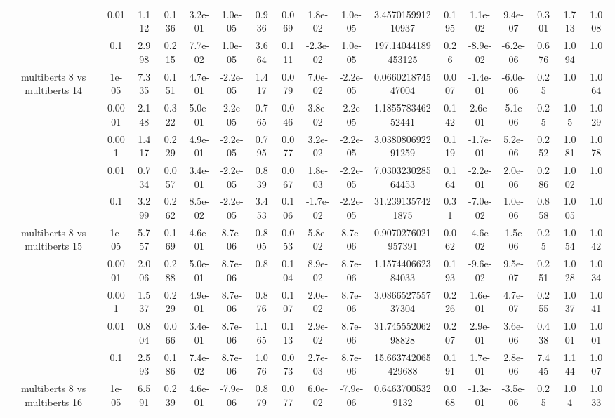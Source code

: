 \begin{tabular}{|c|c|c|c|c|c|c|c|c|c|c|c|c|c|c|c|c|}
 & 0.01 & 1.112 & 0.136 & 3.2e-01 & 1.0e-05 & 0.936 & 0.069 & 1.8e-02 & 1.0e-05 & 3.457015991210937 & 0.195 & 1.1e-02 & 9.4e-07 & 0.301 & 1.713 & 1.008 \\
 & 0.1 & 2.998 & 0.215 & 7.7e-02 & 1.0e-05 & 3.664 & 0.111 & -2.3e-02 & 1.0e-05 & 197.14044189453125 & 0.26 & -8.9e-02 & -6.2e-06 & 0.676 & 1.094 & 1.0 \\
\hline
\multirow{5}{*}{multiberts 8 vs multiberts 14} & 1e-05 & 7.335 & 0.151 & 4.7e-01 & -2.2e-05 & 1.417 & 0.079 & 7.0e-02 & -2.2e-05 & 0.066021874547004 & 0.007 & -1.4e-01 & -6.0e-06 & 0.25 & 1.0 & 1.064 \\
 & 0.0001 & 2.148 & 0.322 & 5.0e-01 & -2.2e-05 & 0.765 & 0.046 & 3.8e-02 & -2.2e-05 & 1.185578346252441 & 0.142 & 2.6e-01 & -5.1e-06 & 0.25 & 1.05 & 1.029 \\
 & 0.001 & 1.417 & 0.229 & 4.9e-01 & -2.2e-05 & 0.795 & 0.077 & 3.2e-02 & -2.2e-05 & 3.038080692291259 & 0.119 & -1.7e-01 & 5.2e-06 & 0.252 & 1.081 & 1.078 \\
 & 0.01 & 0.734 & 0.057 & 3.4e-01 & -2.2e-05 & 0.839 & 0.067 & 1.8e-03 & -2.2e-05 & 7.030323028564453 & 0.164 & -2.2e-01 & 2.0e-06 & 0.286 & 1.002 & 1.0 \\
 & 0.1 & 3.299 & 0.262 & 8.5e-02 & -2.2e-05 & 3.453 & 0.106 & -1.7e-02 & -2.2e-05 & 31.2391357421875 & 0.31 & -7.0e-02 & 1.0e-06 & 0.858 & 1.005 & 1.0 \\
\hline
\multirow{5}{*}{multiberts 8 vs multiberts 15} & 1e-05 & 5.757 & 0.169 & 4.6e-01 & 8.7e-06 & 0.805 & 0.053 & 5.8e-02 & 8.7e-06 & 0.9070276021957391 & 0.062 & -4.6e-02 & -1.5e-06 & 0.25 & 1.054 & 1.042 \\
 & 0.0001 & 2.006 & 0.288 & 5.0e-01 & 8.7e-06 & 0.8 & 0.104 & 8.9e-02 & 8.7e-06 & 1.157440662384033 & 0.193 & -9.6e-02 & 9.5e-07 & 0.251 & 1.028 & 1.034 \\
 & 0.001 & 1.537 & 0.229 & 4.9e-01 & 8.7e-06 & 0.876 & 0.107 & 2.0e-02 & 8.7e-06 & 3.086652755737304 & 0.226 & 1.6e-01 & 4.7e-07 & 0.255 & 1.037 & 1.041 \\
 & 0.01 & 0.804 & 0.066 & 3.4e-01 & 8.7e-06 & 1.165 & 0.113 & 2.9e-02 & 8.7e-06 & 31.74555206298828 & 0.207 & 2.9e-01 & 3.6e-06 & 0.438 & 1.001 & 1.001 \\
 & 0.1 & 2.593 & 0.186 & 7.4e-02 & 8.7e-06 & 1.076 & 0.073 & 2.7e-03 & 8.7e-06 & 15.663742065429688 & 0.191 & 1.7e-01 & 2.8e-06 & 7.445 & 1.144 & 1.007 \\
\hline
\multirow{5}{*}{multiberts 8 vs multiberts 16} & 1e-05 & 6.591 & 0.239 & 4.6e-01 & -7.9e-06 & 0.879 & 0.077 & 6.0e-02 & -7.9e-06 & 0.64637005329132 & 0.068 & -1.3e-01 & -3.5e-06 & 0.25 & 1.04 & 1.033 \\

\end{tabular}

